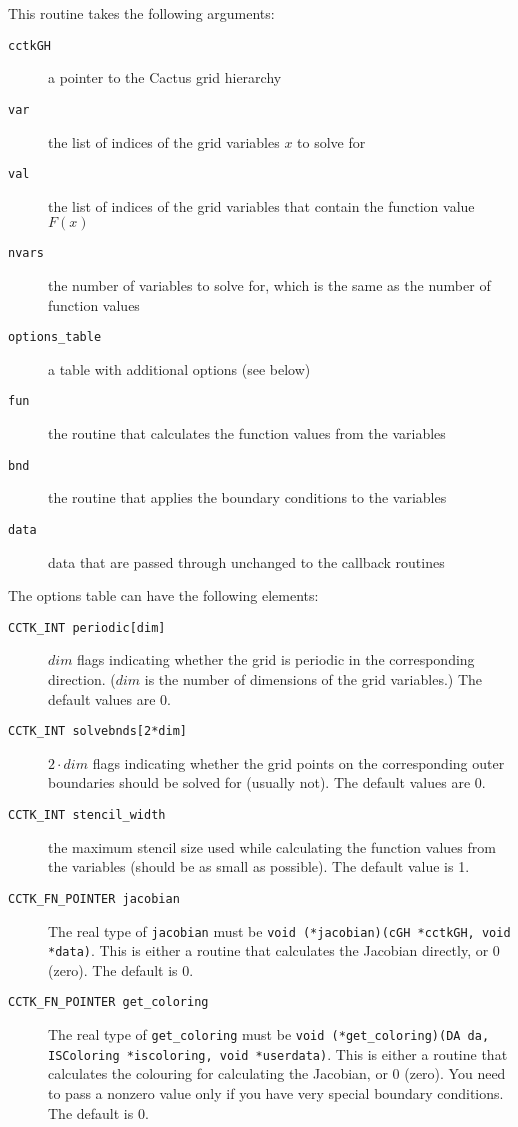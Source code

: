 \documentclass[12pt]{article}
\begin{document}
This routine takes the following arguments:
\begin{description}
   \item[\texttt{cctkGH}] a pointer to the Cactus grid hierarchy

   \item[\texttt{var}] the list of indices of the grid variables $x$
   to solve for

   \item[\texttt{val}] the list of indices of the grid variables that
   contain the function value $F(x)$

   \item[\texttt{nvars}] the number of variables to solve for, which
   is the same as the number of function values

   \item[\texttt{options\_table}] a table with additional options (see
   below)

   \item[\texttt{fun}] the routine that calculates the function values
   from the variables

   \item[\texttt{bnd}] the routine that applies the boundary
   conditions to the variables

   \item[\texttt{data}] data that are passed through unchanged to the
   callback routines
\end{description}

The options table can have the following elements:
\begin{description}
   \item[\texttt{CCTK\_INT periodic[dim]}] $dim$ flags indicating
   whether the grid is periodic in the corresponding direction.
   ($dim$ is the number of dimensions of the grid variables.)  The
   default values are 0.

   \item[\texttt{CCTK\_INT solvebnds[2*dim]}] $2\cdot dim$ flags
   indicating whether the grid points on the corresponding outer
   boundaries should be solved for (usually not).  The default values
   are 0.

   \item[\texttt{CCTK\_INT stencil\_width}] the maximum stencil size
   used while calculating the function values from the variables
   (should be as small as possible).  The default value is 1.

   \item[\texttt{CCTK\_FN\_POINTER jacobian}] The real type of
   \texttt{jacobian} must be \texttt{void (*jacobian)(cGH *cctkGH,
   void *data)}.  This is either a routine that calculates the
   Jacobian directly, or 0 (zero).  The default is 0.

   \item[\texttt{CCTK\_FN\_POINTER get\_coloring}] The real type of
   \texttt{get\_coloring} must be \texttt{void (*get\_coloring)(DA da,
   ISColoring *iscoloring, void *userdata)}.  This is either a routine
   that calculates the colouring for calculating the Jacobian, or 0
   (zero).  You need to pass a nonzero value only if you have very
   special boundary conditions.  The default is 0.
\end{description}
\end{document}

